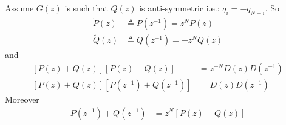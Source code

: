 \documentclass[a4paper,twoside,10pt,english]{report}
\begin{document}
Assume $G\left(z\right)$ is such that $Q\left(z\right)$ is anti-symmetric
i.e.: $q_{i}=-q_{N-i}$. So
\begin{align*}
\tilde{P}\left(z\right) & \triangleq P\left(z^{-1}\right) = z^{N}P\left(z\right)\\
\tilde{Q}\left(z\right) & \triangleq Q\left(z^{-1}\right) = -z^{N}Q\left(z\right)
\end{align*}
and
\begin{align*}
\left[P\left(z\right)+Q\left(z\right)\right]\left[P\left(z\right)-Q\left(z\right)\right] &=  z^{-N}D\left(z\right)D\left(z^{-1}\right)\\
\left[P\left(z\right)+Q\left(z\right)\right]\left[P\left(z^{-1}\right)+Q\left(z^{-1}\right)\right] &=  D\left(z\right)D\left(z^{-1}\right)
\end{align*}
Moreover
\begin{align*}
P\left(z^{-1}\right)+Q\left(z^{-1}\right) &=  z^{N}\left[P\left(z\right)-Q\left(z\right)\right]
\end{align*}
\end{document}
